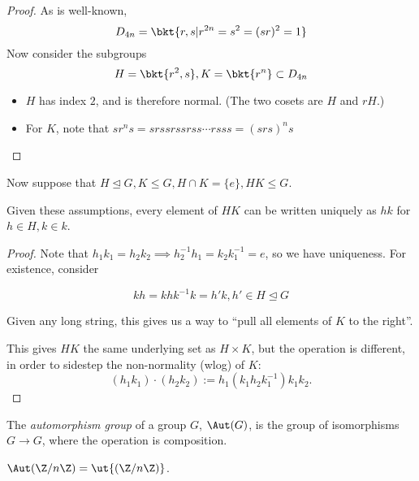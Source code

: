 \documentclass{article}
\begin{document}
\begin{proof}
  As is well-known,
  $$D_{4n} = \bkt{r,s|r^{2n} = s^2 = (sr)^2 = 1}$$
  Now consider the subgroups
  $$H=\bkt{r^2,s}, K=\bkt{r^n}\subset D_{4n}$$

  \begin{itemize}
  \item $H$ has index $2$, and is therefore normal. (The two cosets are $H$ and
    $rH$.)
  \item For $K$, note that $sr^ns = srssrssrss\cdots rsss = (srs)^ns$
  \end{itemize}
\end{proof}

Now suppose that $H\trianglelefteq G, K\leq G, H\cap K=\{e\}, HK\leq G$.

\begin{prop}
 Given these assumptions, every element of $HK$ can be written uniquely as $hk$
 for $h\in H, k\in k$. 
\end{prop}

\begin{proof}
 Note that $h_1k_1=h_2k_2\implies h_2^{-1}h_1 = k_2k_1^{-1} = e$, so we have
 uniqueness. For existence, consider

$$kh = khk^{-1}k =  h'k, h'\in H\trianglelefteq G$$

Given any long string, this gives us a way to ``pull all elements of $K$ to the
right''.

This gives $HK$ the same underlying set as $H\times K$, but the operation is
different, in order to sidestep the non-normality (wlog) of $K$:
$$(h_1k_1)\cdot(h_2k_2) := h_1(k_1h_2k_1^{-1})k_1k_2.$$
\end{proof}

\begin{defn}
The \textit{automorphism group} of a group $G$, $\Aut(G)$, is the group of
isomorphisms $G\to G$, where the operation is composition.  
\end{defn}
 
\begin{example}
 $\Aut(\Z/n\Z) = \ut {(\Z/n\Z)}$. 
\end{example}
\end{document}

